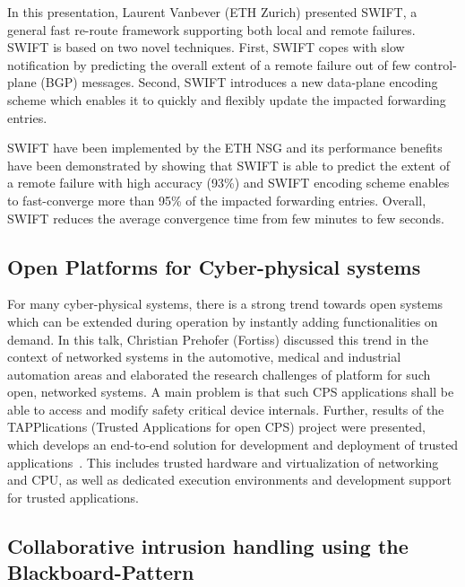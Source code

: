 In this presentation, Laurent Vanbever (ETH Zurich) presented SWIFT, a general
fast re-route framework supporting both local and remote failures.  SWIFT is
based on two novel techniques. First, SWIFT copes with slow notification by
predicting the overall extent of a remote failure out of few control-plane
(BGP) messages. Second, SWIFT introduces a new data-plane encoding scheme
which enables it to quickly and flexibly update the impacted forwarding
entries.

SWIFT have been implemented by the ETH \ac{NSG} and its performance benefits
have been demonstrated by showing that SWIFT is able to predict the extent of
a remote failure with high accuracy (93\%) and SWIFT encoding scheme enables
to fast-converge more than 95\% of the impacted forwarding entries. Overall,
SWIFT reduces the average convergence time from few minutes to few seconds.


\subsection{Open Platforms for Cyber-physical systems}

For many cyber-physical systems, there is a strong trend towards open systems
which can be extended during operation by instantly adding functionalities on
demand. In this talk, Christian Prehofer (Fortiss) discussed this trend in the
context of networked systems in the automotive, medical and industrial
automation areas and elaborated the research challenges of platform for such
open, networked systems. A main problem is that such CPS applications shall be able to
access and modify safety critical device internals. Further, results of the
TAPPlications (Trusted Applications for open CPS) project were presented, which  develops an
end-to-end solution for development and deployment of trusted
applications~\cite{prehofer:eitec:2016}. This includes trusted hardware and
virtualization of networking and CPU, as well as dedicated execution
environments and development support for trusted applications.


\subsection{Collaborative intrusion handling using the Blackboard-Pattern}

